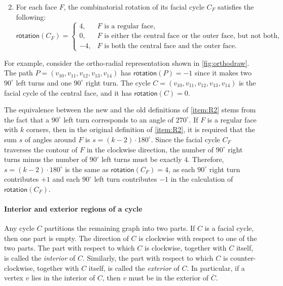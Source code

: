 \documentclass{article}\usepackage[a4paper,margin=20mm]{geometry}
\newcommand{\rotation}{\mathsf{rotation}}
\begin{document}
\begin{enumerate}[(R1$'$)]\setcounter{enumi}{1}
    \item For each face $F$, the combinatorial rotation of its facial cycle $C_F$ satisfies the following:
\[\rotation(C_F)=\begin{cases}
			4, & \text{$F$ is a regular face,}\\
            0, & \text{$F$ is either the central face or the outer face, but not both,}\\
            -4, & \text{$F$ is both the central face and the outer face.}
		 \end{cases}\]
\end{enumerate}

For example, consider the ortho-radial representation shown in \cref{fig:orthodraw}. The path $P=(v_{10}, v_{11}, v_{12}, v_{13}, v_{14})$  has $\rotation(P) = -1$ since it makes two $90^\circ$  left turns and one $90^\circ$ right turn. The cycle $C=(v_{10}, v_{11}, v_{12}, v_{13}, v_{14})$ is the facial cycle of the central face, and it has $\rotation(C) = 0$.

The equivalence between the new and the old definitions of \ref{item:R2} stems from the fact that a $90^\circ$ left turn corresponds to an angle of $270^\circ$.
If $F$ is a regular face with $k$ corners, then in the original definition of \ref{item:R2}, it is required that the sum $s$ of angles around $F$ is $s = (k-2)\cdot 180^\circ$. Since the facial cycle $C_F$ traverses the contour of $F$ in the clockwise direction, the number of $90^\circ$ right turns minus the number of $90^\circ$ left turns must be exactly $4$. Therefore, $s = (k-2)\cdot 180^\circ$ is the same as $\rotation(C_F) = 4$, as each $90^\circ$ right turn contributes $+1$ and each $90^\circ$ left turn contributes $-1$ in the calculation of $\rotation(C_F)$.  

\paragraph{Interior and exterior regions of a cycle}
Any cycle $C$ partitions the remaining graph into two parts. If $C$ is a facial cycle, then one part is empty. The direction of $C$ is clockwise with respect to one of the two parts. The part with respect to which $C$ is clockwise, together with $C$ itself, is called the \emph{interior} of $C$. Similarly, the part with respect to which $C$ is counter-clockwise, together with $C$ itself, is called the \emph{exterior} of $C$. In particular, if a vertex $v$ lies in the interior of $C$, then $v$ must be in the exterior of $\overline{C}$. 
\end{document}
